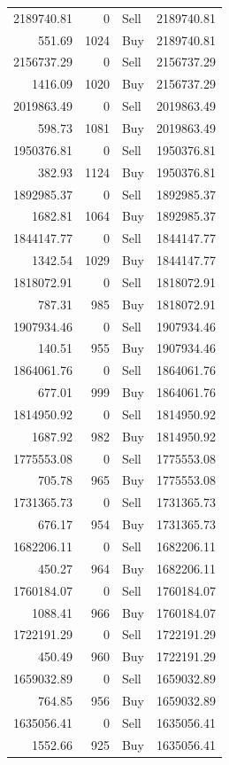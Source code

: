 \begin{longtable}{rrlr}
2189740.81 & 0 & Sell & 2189740.81 \\
551.69 & 1024 & Buy & 2189740.81 \\
2156737.29 & 0 & Sell & 2156737.29 \\
1416.09 & 1020 & Buy & 2156737.29 \\
2019863.49 & 0 & Sell & 2019863.49 \\
598.73 & 1081 & Buy & 2019863.49 \\
1950376.81 & 0 & Sell & 1950376.81 \\
382.93 & 1124 & Buy & 1950376.81 \\
1892985.37 & 0 & Sell & 1892985.37 \\
1682.81 & 1064 & Buy & 1892985.37 \\
1844147.77 & 0 & Sell & 1844147.77 \\
1342.54 & 1029 & Buy & 1844147.77 \\
1818072.91 & 0 & Sell & 1818072.91 \\
787.31 & 985 & Buy & 1818072.91 \\
1907934.46 & 0 & Sell & 1907934.46 \\
140.51 & 955 & Buy & 1907934.46 \\
1864061.76 & 0 & Sell & 1864061.76 \\
677.01 & 999 & Buy & 1864061.76 \\
1814950.92 & 0 & Sell & 1814950.92 \\
1687.92 & 982 & Buy & 1814950.92 \\
1775553.08 & 0 & Sell & 1775553.08 \\
705.78 & 965 & Buy & 1775553.08 \\
1731365.73 & 0 & Sell & 1731365.73 \\
676.17 & 954 & Buy & 1731365.73 \\
1682206.11 & 0 & Sell & 1682206.11 \\
450.27 & 964 & Buy & 1682206.11 \\
1760184.07 & 0 & Sell & 1760184.07 \\
1088.41 & 966 & Buy & 1760184.07 \\
1722191.29 & 0 & Sell & 1722191.29 \\
450.49 & 960 & Buy & 1722191.29 \\
1659032.89 & 0 & Sell & 1659032.89 \\
764.85 & 956 & Buy & 1659032.89 \\
1635056.41 & 0 & Sell & 1635056.41 \\
1552.66 & 925 & Buy & 1635056.41 \\

\end{longtable}
